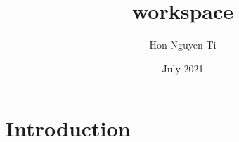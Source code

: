 \documentclass{article}
\title{workspace}
\author{Hon Nguyen Ti}
\date{July 2021}
\begin{document}
\maketitle

\section{Introduction}
\end{document}
